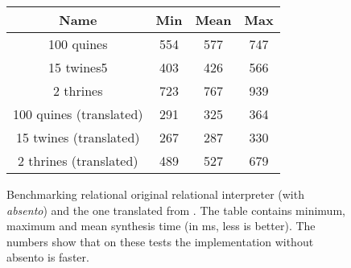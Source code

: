 \begin{figure}
\begin{tabular}{c|c|c|c }
Name &     Min &    Mean &     Max \\\hline
100 quines &   554&   577&   747\\
15 twines5 &   403&   426&   566\\
2 thrines &   723&   767&   939\\
100 quines (translated) &   291&   325&   364\\
15 twines (translated) &   267&   287&   330\\
2 thrines (translated) &   489&   527&   679\\
\end{tabular}
\label{fig:benchmarks}
\caption{Benchmarking relational original relational interpreter (with \emph{absento}) and the one translated from \OCanren{}.
The table contains minimum, maximum and mean synthesis time (in ms, less is better).
The numbers show that on these tests the implementation without absento is faster.}
\end{figure}

%

